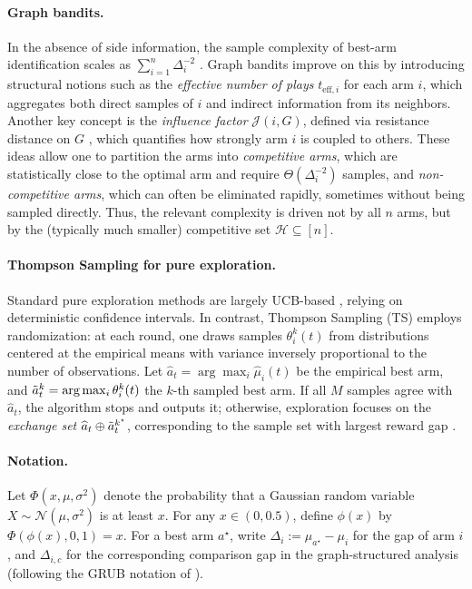 \documentclass{article}
\begin{document}
\paragraph{Graph bandits.}
In the absence of side information, the sample complexity of best-arm identification
scales as $\sum_{i=1}^n \Delta_i^{-2}$ \citep{audibert2010best, kaufmann2016complexity}.
Graph bandits improve on this by introducing structural notions such as the
\emph{effective number of plays} $t_{\mathrm{eff},i}$ for each arm $i$,
which aggregates both direct samples of $i$ and indirect information from its neighbors.
Another key concept is the \emph{influence factor} $\mathcal{J}(i,G)$,
defined via resistance distance on $G$ \citep{xiao2003resistance},
which quantifies how strongly arm $i$ is coupled to others.
These ideas allow one to partition the arms into
\emph{competitive arms}, which are statistically close to the optimal arm
and require $\Theta(\Delta_i^{-2})$ samples, and
\emph{non-competitive arms}, which can often be eliminated rapidly,
sometimes without being sampled directly.
Thus, the relevant complexity is driven not by all $n$ arms,
but by the (typically much smaller) competitive set $\mathcal{H} \subseteq [n]$.

\paragraph{Thompson Sampling for pure exploration.}
Standard pure exploration methods are largely UCB-based
\citep{kalyanakrishnan2012pac, chen2014combinatorial}, relying on deterministic confidence intervals.
In contrast, Thompson Sampling (TS) employs randomization:
at each round, one draws samples $\theta_i^k(t)$ from distributions centered at the empirical means
with variance inversely proportional to the number of observations.
Let $\widehat{a}_t = \arg\max_i \widehat{\mu}_i(t)$ be the empirical best arm, and
$\Tilde{a}_t^k = \arg\max_i \theta_i^k(t)$ the $k$-th sampled best arm.
If all $M$ samples agree with $\widehat{a}_t$, the algorithm stops and outputs it;
otherwise, exploration focuses on the \emph{exchange set}
$\widehat{a}_t \oplus \Tilde{a}_t^{k^\star}$, corresponding to the sample set with largest reward gap
\citep{wang2022thompson}.

\paragraph{Notation.}
Let $\Phi(x,\mu,\sigma^2)$ denote the probability that a Gaussian random variable $X\sim \mathcal N(\mu,\sigma^2)$ is at least $x$. For any $x\in(0,0.5)$, define $\phi(x)$ by $\Phi(\phi(x),0,1)=x$. For a best arm $a^\star$, write $\Delta_i:=\mu_{a^\star}-\mu_i$ for the gap of arm $i$, and $\Delta_{i,c}$ for the corresponding comparison gap in the graph-structured analysis (following the GRUB notation of \cite{thaker2022maximizing}).
\end{document}
